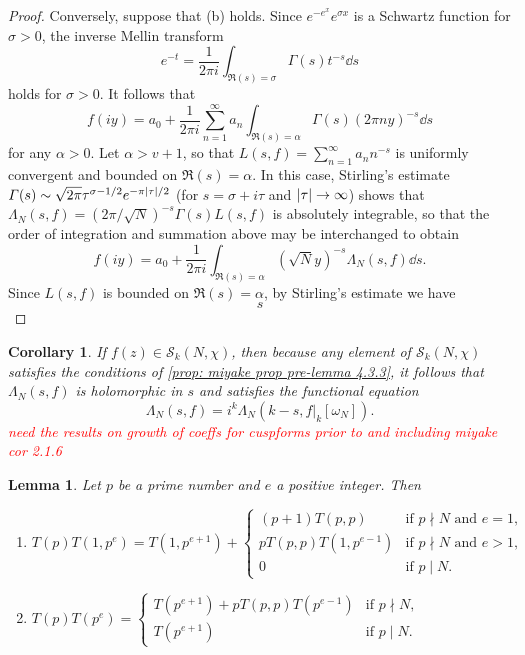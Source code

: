 \documentclass[10pt,leqno,twoside]{article}
\theoremstyle{plain}
\newtheorem{lemma}[lem]{Lemma}
\newtheorem{corollary}[lem]{Corollary}
\theoremstyle{definition}
\numberwithin{equation}{section}
\numberwithin{lem}{section}
\newcommand{\sai}[1]{\textcolor{red}{#1}}
\begin{document}
\begin{proof}
    Conversely, suppose that (b) holds. Since $e^{-e^x}e^{\sigma x}$ is a Schwartz function for $\sigma>0$, the inverse Mellin transform 
    \[e^{-t} = \frac{1}{2\pi i}\int_{\Re(s) = \sigma}\varGamma(s)t^{-s}\dd s\]
    holds for $\sigma>0$. It follows that 
    \[f(iy) = a_0 + \frac{1}{2\pi i}\sum_{n=1}^\infty a_n\int_{\Re(s) =\alpha}\varGamma(s)(2\pi n y)^{-s}\dd s\] for any $\alpha>0$. Let $\alpha>v+1$, so that $L(s,f) = \sum_{n=1}^\infty a_nn^{-s}$ is uniformly convergent and bounded on $\Re(s) = \alpha$. In this case, Stirling's estimate $\varGamma(s)\sim \sqrt{2\pi} \tau^{\sigma -1/2}e^{-\pi\abs{\tau}/2}$ (for $s = \sigma + i\tau$ and $\abs{\tau}\to\infty$) shows that $\varLambda_N(s,f) = (2\pi/\sqrt{N})^{-s}\varGamma(s)L(s,f)$ is absolutely integrable, so that the order of integration and summation above may be interchanged to obtain
    \[f(iy) = a_0 + \frac{1}{2\pi i} \int_{\Re(s) = \alpha} (\sqrt{N}y)^{-s}\varLambda_N(s,f)\dd s.\]
    Since $L(s,f)$ is bounded on $\Re(s) = \alpha$, by Stirling's estimate we have 
    \begin{equation}
        s
    \end{equation}
\end{proof}
\begin{corollary}\label{cor: miyake cor 4.3.7}
    If $f(z)\in \mathcal S_k(N,\chi)$, then because any element of $\mathcal S_k(N,\chi)$ satisfies the conditions of \cref{prop: miyake prop pre-lemma 4.3.3}, it follows that $\varLambda_N(s,f)$ is holomorphic in $s$ and satisfies the functional equation
    \[\varLambda_N(s,f) = i^k\varLambda_N(k-s,f|_k[\omega_N]).\]\sai{need the results on growth of coeffs for cuspforms prior to and including miyake cor 2.1.6}
\end{corollary}
\begin{lemma}\label{lem: miyake lem 4.5.7}
    Let $p$ be a prime number and $e$ a positive integer. Then \begin{enumerate}[label=\textup{(\arabic*)}]
        \item $T(p)T(1,p^e) = T(1,p^{e+1}) + \begin{cases}
            (p+1)T(p,p) & \text{if $p\nmid N$ and $e=1$,}\\
            pT(p,p)T(1,p^{e-1}) & \text{if $p\nmid N$ and $e > 1$,}\\
            0 & \text{if $p\mid N$.}
        \end{cases}$
        \item $T(p)T(p^e) = \begin{cases}
            T(p^{e+1})+pT(p,p)T(p^{e-1}) & \text{if $p\nmid N$,}\\
            T(p^{e+1}) & \text{if $p\mid N$.}
        \end{cases}$
    \end{enumerate}
\end{lemma}
\end{document}
